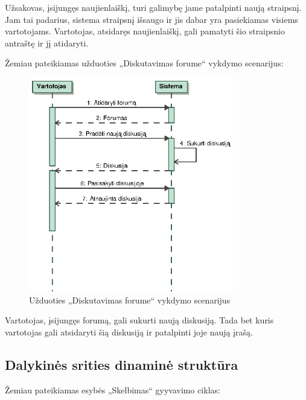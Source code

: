 \documentclass[12pt]{article}
\begin{document}
	Užsakovas, įsijungęs naujienlaiškį, turi galimybę jame patalpinti naują straipsnį. Jam tai padarius, sistema straipsnį išsaugo ir jis dabar yra pasiekiamas visiems vartotojams. Vartotojas, atsidaręs naujienlaiškį, gali pamatyti šio straipsnio antraštę ir jį atidaryti.
	\pagebreak
	
	Žemiau pateikiamas užduoties „Diskutavimas forume“ vykdymo scenarijus:
	
	\begin{figure}[h]
		\begin{center}
			\includegraphics[width=0.8\textwidth]{Forumas.eps}
			\caption{Užduoties „Diskutavimas forume“ vykdymo scenarijus\label{ForumScenario}}
		\end{center}
	\end{figure}
	
	Vartotojas, įsijungęs forumą, gali sukurti naują diskusiją. Tada bet kuris vartotojas gali atsidaryti šią diskusiją ir patalpinti joje naują įrašą.
	\pagebreak
	
	\subsection{Dalykinės srities dinaminė struktūra}
	
	Žemiau pateikiamas esybės „Skelbimas“ gyyvavimo ciklas:
	
\end{document}
